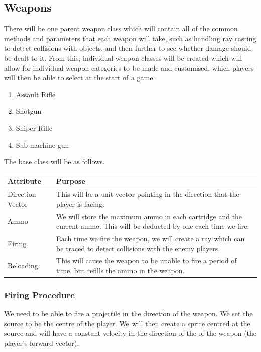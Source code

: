 \subsection{Weapons}

There will be one parent weapon class which will contain all of the common methods and parameters that each weapon will take, such as handling ray casting to detect collisions with objects, and then further to see whether damage should be dealt to it. From this, individual weapon classes will be created which will allow for individual weapon categories to be made and customised, which players will then be able to select at the start of a game.

\begin{enumerate}[label=\alph*)]
    \item Assault Rifle
    \item Shotgun
    \item Sniper Rifle
    \item Sub-machine gun
\end{enumerate}

The base class will be as follows.

\vs
\begin{longtable}{|p{4cm}|p{11.5cm}|}
    \hline
    Attribute & Purpose\\
    \hline
    \hline
    Direction Vector & This will be a unit vector pointing in the direction that the player is facing.\\
    \hline
    Ammo & We will store the maximum ammo in each cartridge and the current ammo. This will be deducted by one each time we fire.\\
    \hline
    Firing & Each time we fire the weapon, we will create a ray which can be traced to detect collisions with the enemy players.\\
    \hline
    Reloading & This will cause the weapon to be unable to fire a period of time, but refills the ammo in the weapon.\\
    \hline
\end{longtable}

\subsubsection{Firing Procedure}

We need to be able to fire a projectile in the direction of the weapon. We set the source to be the centre of the player. We will then create a sprite centred at the source and will have a constant velocity in the direction of the of the weapon (the player's forward vector).

